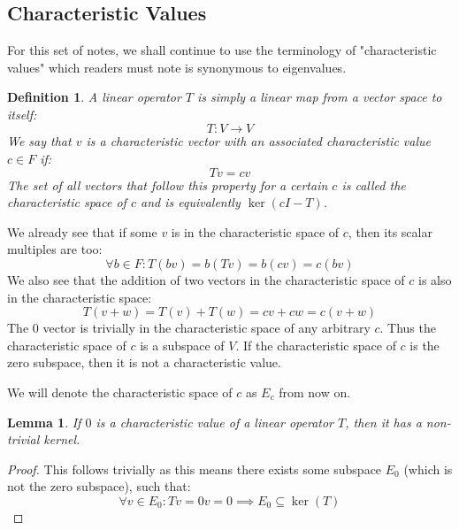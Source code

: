 \documentclass[10pt,letterpaper]{article} %
\newtheorem{lem}{Lemma}[section]
\newtheorem{defn}{Definition}[section]
\begin{document}
\subsection{Characteristic Values}
For this set of notes, we shall continue to use the terminology of "characteristic values" which readers must note is synonymous to eigenvalues.

\begin{defn}
A linear operator $T$ is simply a linear map from a vector space to itself:
\begin{equation*}
T: V \xrightarrow{} V
\end{equation*}
We say that $v$ is a characteristic vector with an associated characteristic value $c \in F$ if:
\begin{equation*}
Tv = cv
\end{equation*}
The set of all vectors that follow this property for a certain $c$ is called the characteristic space of $c$ and is equivalently $\ker(cI - T)$.
\end{defn}
We already see that if some $v$ is in the characteristic space of $c$, then its scalar multiples are too:
\begin{equation*}
\forall b \in F: T(bv) = b(Tv) = b(cv) = c(bv)
\end{equation*}
We also see that the addition of two vectors in the characteristic space of $c$ is also in the characteristic space:
\begin{equation*}
T(v + w) = T(v) + T(w) = cv + cw = c(v+w)
\end{equation*}
The $0$ vector is trivially in the characteristic space of any arbitrary $c$. Thus the characteristic space of $c$ is a subspace of $V$. If the characteristic space of $c$ is the zero subspace, then it is not a characteristic value.

We will denote the characteristic space of $c$ as $E_c$ from now on.

\begin{lem}
If $0$ is a characteristic value of a linear operator $T$, then it has a non-trivial kernel.
\end{lem}
\begin{proof}
This follows trivially as this means there exists some subspace $E_0$ (which is not the zero subspace), such that:
\begin{equation*}
\forall v \in E_0: Tv = 0v = 0 \implies E_0 \subseteq \ker(T)
\end{equation*}
\end{proof}
\end{document}
